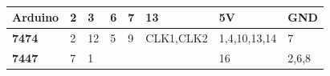 \documentclass[journal,12pt,twocolumn]{IEEEtran}
\begin{document}
\newpage
\begin{table}[h!]
\begin{center}
\begin{tabular}{ | m{5em} | m{1cm}| m{1cm} |m{1cm} |m{1cm} |m{2.5cm} |m{3cm} |m{2cm} | } 
  \hline
  \textbf{Arduino} & 2 & 3& 6& 7& 13& 5V& GND \\ 
  \hline
  \textbf{7474} & 2 & 12 & 5&9 & CLK1,CLK2& 1,4,10,13,14& 7\\ 
  \hline
  \textbf{7447} & 7 & 1 & & & & 16& 2,6,8\\ 
  \hline
\end{tabular}
\caption{}
\label{table:2}
\end{center}
\end{table}
\end{document}
